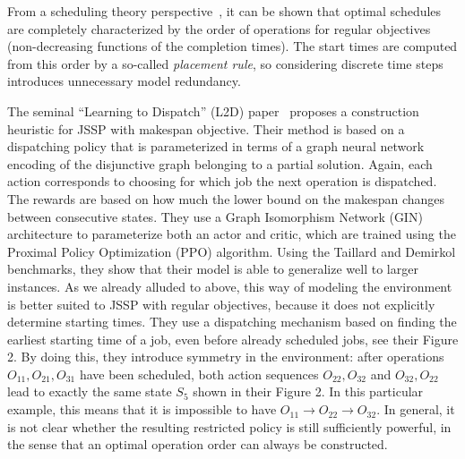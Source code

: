 \documentclass{article}
\theoremstyle{definition}
\theoremstyle{plain}
\begin{document}
From a scheduling theory
perspective~\cite{pinedoSchedulingTheoryAlgorithms2016}, it can be shown that
optimal schedules are completely characterized by the order of operations for
regular objectives (non-decreasing functions of the completion times). The start
times are computed from this order by a so-called \textit{placement rule}, so
considering discrete time steps introduces unnecessary model redundancy.


The seminal ``Learning to Dispatch'' (L2D)
paper~\cite{zhangLearningDispatchJob2020} proposes a construction heuristic for
JSSP with makespan objective. Their method is based on a dispatching policy that
is parameterized in terms of a graph neural network encoding of the disjunctive
graph belonging to a partial solution. Again, each action corresponds to
choosing for which job the next operation is dispatched. The rewards are based
on how much the lower bound on the makespan changes between consecutive states.
They use a Graph Isomorphism Network (GIN) architecture to parameterize both an
actor and critic, which are trained using the Proximal Policy Optimization (PPO)
algorithm. Using the Taillard and Demirkol benchmarks, they show that their
model is able to generalize well to larger instances.
As we already alluded to above, this way of modeling the environment is better
suited to JSSP with regular objectives, because it does not explicitly determine
starting times.
%
They use a dispatching mechanism based on finding the earliest starting time of
a job, even before already scheduled jobs, see their Figure 2. By doing this,
they introduce symmetry in the environment: after operations
$O_{11}, O_{21}, O_{31}$ have been scheduled, both action sequences
$O_{22}, O_{32}$ and $O_{32}, O_{22}$ lead to exactly the same state $S_5$ shown
in their Figure 2. In this particular example, this means that it is impossible
to have $O_{11} \rightarrow O_{22} \rightarrow O_{32}$. In general, it is not
clear whether the resulting restricted policy is still sufficiently powerful, in
the sense that an optimal operation order can always be constructed.

\end{document}
